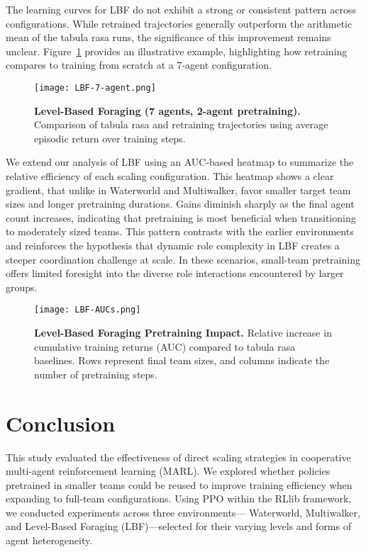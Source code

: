 \documentclass{article}
\begin{document}
The learning curves for LBF do not exhibit a strong or consistent pattern across configurations. 
While retrained trajectories generally outperform the arithmetic mean of the tabula rasa runs, 
the significance of this improvement remains unclear. 
Figure~\ref{fig:lbf-7} provides an illustrative example, highlighting how retraining compares 
to training from scratch at a 7-agent configuration.

\begin{figure}[!h]
    \centering
    \texttt{[image: LBF-7-agent.png]}
    \caption{\textbf{Level-Based Foraging (7 agents, 2-agent pretraining).} Comparison of tabula 
    rasa and retraining trajectories using average episodic return over training steps.}
    \label{fig:lbf-7}
\end{figure}

We extend our analysis of LBF using an AUC-based heatmap to summarize the 
relative efficiency of each scaling configuration. 
This heatmap shows a clear gradient, that unlike in Waterworld and Multiwalker, 
favor smaller target team sizes and longer pretraining durations. 
Gains diminish sharply as the final agent count increases, 
indicating that pretraining is most beneficial when transitioning to moderately sized teams. 
This pattern contrasts with the earlier environments and reinforces the hypothesis that 
dynamic role complexity in LBF creates a steeper coordination challenge at scale. 
In these scenarios, small-team pretraining offers limited foresight into the diverse role 
interactions encountered by larger groups.

\begin{figure}[h]
    \centering
    \texttt{[image: LBF-AUCs.png]}
    \caption{\textbf{Level-Based Foraging Pretraining Impact.} 
    Relative increase in cumulative training returns (AUC) compared to tabula rasa baselines. 
    Rows represent final team sizes, and columns indicate the number of pretraining steps.}
    \label{fig:lbf-aucs}
\end{figure}

\FloatBarrier

\section{Conclusion}

This study evaluated the effectiveness of direct scaling strategies in cooperative multi-agent 
reinforcement learning (MARL). We explored whether policies pretrained in smaller teams could 
be reused to improve training efficiency when expanding to full-team configurations. 
Using PPO within the RLlib framework, we conducted experiments across three environments—
Waterworld, Multiwalker, and Level-Based Foraging (LBF)—selected for their varying 
levels and forms of agent heterogeneity.
\end{document}
